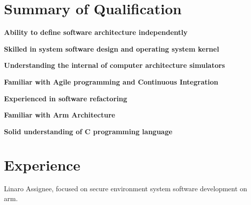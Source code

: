 \documentclass[letterpaper]{deedy-resume} %
\begin{document}
%
\begin{minipage}[t]{0.66\textwidth} %

\section{Summary of Qualification} 
\vspace{\topsep} %
\begin{tightitemize}
\item \bf Ability to define software architecture independently
\item \bf Skilled in system software design and operating system kernel
\item \bf Understanding the internal of computer architecture simulators
\item \bf Familiar with Agile programming and Continuous Integration
\item \bf Experienced in software refactoring
\item \bf Familiar with Arm Architecture
\item \bf Solid understanding of C programming language
\end{tightitemize}

\section{Experience}


\vspace{\topsep} %
\begin{tightitemize}
\item Linaro Assignee, focused on secure environment system software development on arm.
\end{tightitemize}

\sectionspace %




\end{minipage}
\end{document}
